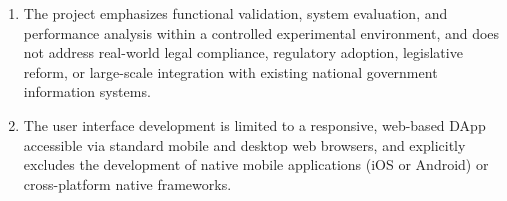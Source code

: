 \begin{enumerate}
   \item The project emphasizes functional validation, system evaluation, and performance analysis within a controlled experimental environment, and does not address real-world legal compliance, regulatory adoption, legislative reform, or large-scale integration with existing national government information systems.

   \item The user interface development is limited to a responsive, web-based \ac{DApp} accessible via standard mobile and desktop web browsers, and explicitly excludes the development of native mobile applications (iOS or Android) or cross-platform native frameworks.

\end{enumerate}







